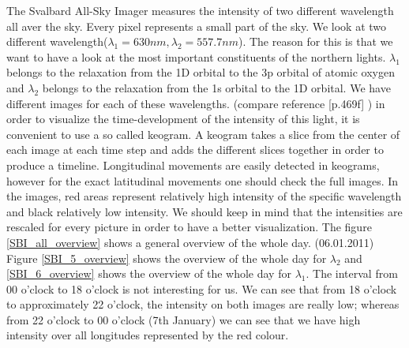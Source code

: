 \documentclass[10pt,a4paper]{article}
\begin{document}
The Svalbard All-Sky Imager measures the intensity of two different wavelength all aver the sky. Every pixel represents a small part of the sky. We look at two different 
wavelength($\lambda_1=630 nm, \lambda_2= 557.7 nm$). The reason for this is that we want to have a look at the most important constituents of the northern lights. 
$\lambda_1$ belongs to the relaxation from the 1D orbital to the 3p orbital of atomic oxygen and $\lambda_2$ belongs to the relaxation from the 1s orbital to the 1D 
orbital. We have different images for each of these wavelengths. (compare reference \cite{Buch2}[p.469f] )
in order to visualize the time-development of the intensity of this light, it is convenient to use a so called keogram. A keogram takes a slice from the center of each 
image at each time  step and adds the different slices together in order to produce a timeline. Longitudinal movements are easily detected in keograms, however for 
the exact latitudinal movements one should check the full images. In the images, red areas represent relatively high intensity of the specific wavelength and black 
relatively low intensity. We should keep in mind that the intensities are rescaled for every picture in order to have a better visualization. 
The figure \ref{SBI_all_overview} shows a general overview of the whole day. (06.01.2011) Figure \ref{SBI_5_overview} shows the overview of the whole day for 
$\lambda_2$ and \ref{SBI_6_overview} shows the overview of the whole day for $\lambda_1$. The interval from 00 o'clock to 18 o'clock is not interesting for us. 
We can see that from 18 o'clock to approximately 22 o'clock, the intensity on both images are really low; whereas from 22 o'clock to 00 o'clock (7th January) 
we can see that we have high intensity over all longitudes represented by the red colour.
\end{document}
